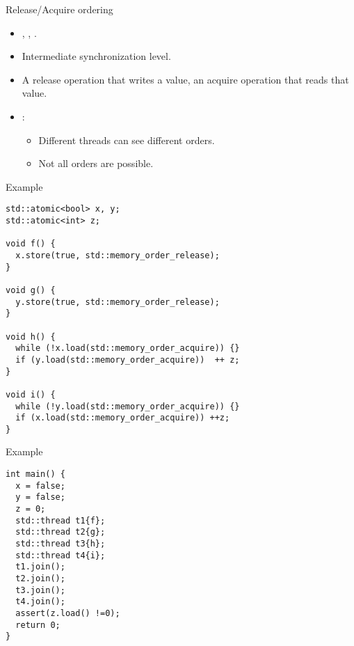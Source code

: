 \begin{frame}[t]{Release/Acquire ordering}
\begin{itemize}
  \item {}, , .
  \item Intermediate synchronization level.
  \item A release operation that writes a value,
         an acquire operation that reads that value.
  \item {}:
    \begin{itemize}
      \item Different threads can see different orders.
      \item Not all orders are possible.
    \end{itemize}
\end{itemize}
\end{frame}


\begin{frame}[t,fragile]{Example}
\begin{lstlisting}
std::atomic<bool> x, y;
std::atomic<int> z;

void f() {
  x.store(true, std::memory_order_release);
}

void g() {
  y.store(true, std::memory_order_release);
}

void h() {
  while (!x.load(std::memory_order_acquire)) {}
  if (y.load(std::memory_order_acquire))  ++ z;
}

void i() {
  while (!y.load(std::memory_order_acquire)) {}
  if (x.load(std::memory_order_acquire)) ++z;
}
\end{lstlisting}
\end{frame}


\begin{frame}[t,fragile]{Example}
\begin{lstlisting}
int main() {
  x = false;
  y = false;
  z = 0;
  std::thread t1{f};
  std::thread t2{g};
  std::thread t3{h};
  std::thread t4{i};
  t1.join();
  t2.join();
  t3.join();
  t4.join();
  assert(z.load() !=0);
  return 0;
}
\end{lstlisting}
\end{frame}

